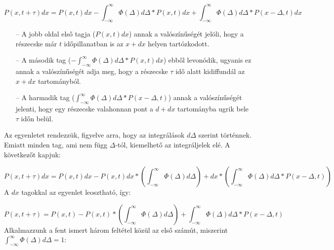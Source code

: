 \begin{equation}
    P \left( x, t + \tau \right) dx
    =
    P \left( x, t \right) dx
    -
    \int_{-\infty}^{\infty} \Phi \left( \Delta \right) d \Delta * P \left( x, t \right) dx
    +
    \int_{-\infty}^{\infty} \Phi \left( \Delta \right) d \Delta * P \left( x - \Delta, t \right) dx
\end{equation}
\begin{itemize}
    \item[--] A jobb oldal első tagja ($P \left( x, t \right) dx$) annak a valószínűségét jelöli, hogy a részecske már $t$ időpillanatban is az $x + dx$ helyen tartózkodott.
    \item[--] A második tag ($- \int_{-\infty}^{\infty} \Phi \left( \Delta \right) d \Delta * P \left( x, t \right) dx$) ebből levonódik, ugyanis ez annak a valószínűségét adja meg, hogy a részecske $\tau$ idő alatt kidiffundál az $x + dx$ tartományból.
    \item[--] A harmadik tag ($\int_{-\infty}^{\infty} \Phi \left( \Delta \right) d \Delta * P \left( x - \Delta, t \right)$) annak a valószínűségét jelenti, hogy egy részecske valahonnan pont a $d + dx$ tartományba ugrik bele $\tau$ időn belül.
\end{itemize}

Az egyenletet rendezzük, figyelve arra, hogy az integrálások $d \Delta$ szerint történnek. Emiatt minden tag, ami nem függ $\Delta$-tól, kiemelhető az integráljelek elé. A következőt kapjuk:

\begin{equation}
    P \left( x, t + \tau \right) dx
    =
    P \left( x, t \right) dx
    -
    P \left( x, t \right) dx * \left( \int_{-\infty}^{\infty} \Phi \left( \Delta \right) d \Delta \right)
    +
    dx * \left( \int_{-\infty}^{\infty} \Phi \left( \Delta \right) d \Delta * P \left( x - \Delta, t \right) \right)
\end{equation}
A $dx$ tagokkal az egyenlet leosztható, így:

\begin{equation}
    P \left( x, t + \tau \right)
    =
    P \left( x, t \right)
    -
    P \left( x, t \right) * \left( \int_{-\infty}^{\infty} \Phi \left( \Delta \right) d \Delta \right)
    +
    \int_{-\infty}^{\infty} \Phi \left( \Delta \right) d \Delta * P \left( x - \Delta, t \right)
\end{equation}
Alkalmazzunk a fent ismert három feltétel közül az első számút, miszerint $\int_{-\infty}^{\infty} \Phi \left( \Delta \right) d \Delta = 1$:

